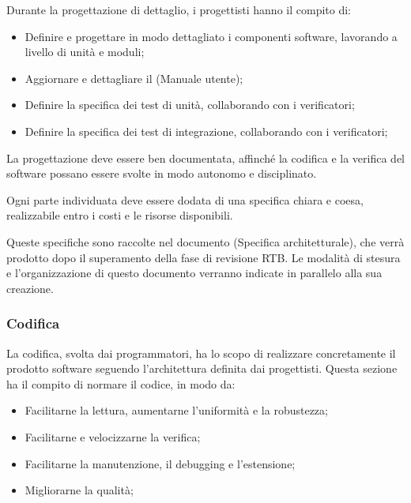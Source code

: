 \documentclass[10pt, a4paper]{article}
\begin{document}
Durante la progettazione di dettaglio, i progettisti hanno il compito di:
\begin{itemize}
    \item Definire e progettare in modo dettagliato i componenti software, lavorando a livello di unità e moduli;
    \item Aggiornare e dettagliare il (Manuale utente);
    \item Definire la specifica dei test di unità, collaborando con i verificatori;
    \item Definire la specifica dei test di integrazione, collaborando con i verificatori;
\end{itemize}

La progettazione deve essere ben documentata, affinché la codifica e la verifica del software possano essere svolte in modo autonomo e disciplinato.

Ogni parte individuata deve essere dodata di una specifica chiara e coesa, realizzabile entro i costi e le risorse disponibili.

Queste specifiche sono raccolte nel documento (Specifica architetturale), che verrà prodotto dopo il superamento della fase di revisione RTB.
Le modalità di stesura e l'organizzazione di questo documento verranno indicate in parallelo alla sua creazione.

\subsubsection{Codifica}
La codifica, svolta dai programmatori, ha lo scopo di realizzare concretamente il prodotto software seguendo l'architettura definita dai progettisti.
Questa sezione ha il compito di normare il codice, in modo da:
\begin{itemize}
    \item Facilitarne la lettura, aumentarne l'uniformità e la robustezza;
    \item Facilitarne e velocizzarne la verifica;
    \item Facilitarne la manutenzione, il debugging e l'estensione;
    \item Migliorarne la qualità;
\end{itemize}
\end{document}
